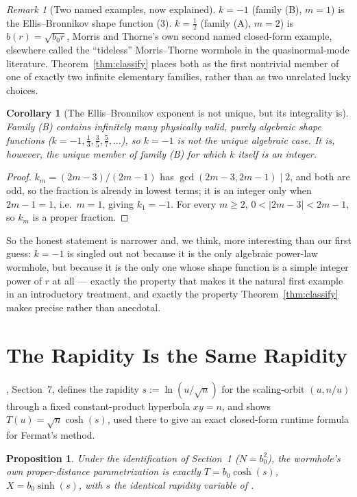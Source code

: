 \documentclass[12pt]{amsart}
\theoremstyle{plain}
\newtheorem{proposition}[theorem]{Proposition}
\newtheorem{corollary}[theorem]{Corollary}
\theoremstyle{remark}
\newtheorem*{remark}{Remark}
\begin{document}
\begin{remark}[Two named examples, now explained]
$k=-1$ (family (B), $m=1$) is the Ellis--Bronnikov shape function (3). $k=\tfrac12$ (family (A), $m=2$) is $b(r)=\sqrt{b_0r}$, Morris and Thorne's own second named closed-form example, elsewhere called the ``tideless'' Morris--Thorne wormhole in the quasinormal-mode literature. Theorem~\ref{thm:classify} places both as the first nontrivial member of one of exactly two infinite elementary families, rather than as two unrelated lucky choices.
\end{remark}

\begin{corollary}[The Ellis--Bronnikov exponent is not unique, but its integrality is]\label{cor:unique}
Family (B) contains infinitely many physically valid, purely algebraic shape functions ($k=-1,\tfrac13,\tfrac35,\tfrac57,\dots$), so $k=-1$ is not the unique algebraic case. It is, however, the unique member of family (B) for which $k$ itself is an integer.
\end{corollary}

\begin{proof}
$k_m=(2m-3)/(2m-1)$ has $\gcd(2m-3,2m-1)\mid 2$, and both are odd, so the fraction is already in lowest terms; it is an integer only when $2m-1=1$, i.e.\ $m=1$, giving $k_1=-1$. For every $m\ge2$, $0<|2m-3|<2m-1$, so $k_m$ is a proper fraction.
\end{proof}

So the honest statement is narrower and, we think, more interesting than our first guess: $k=-1$ is singled out not because it is the only algebraic power-law wormhole, but because it is the only one whose shape function is a simple integer power of $r$ at all --- exactly the property that makes it the natural first example in an introductory treatment, and exactly the property Theorem~\ref{thm:classify} makes precise rather than anecdotal.

\section{The Rapidity Is the Same Rapidity}

\cite{Ebert2026EigenCoord}, Section~7, defines the rapidity $s:=\ln(u/\sqrt n)$ for the scaling-orbit $(u,n/u)$ through a fixed constant-product hyperbola $xy=n$, and shows $T(u)=\sqrt n\cosh(s)$, used there to give an exact closed-form runtime formula for Fermat's method.

\begin{proposition}
Under the identification of Section~1 ($N=b_0^2$), the wormhole's own proper-distance parametrization is exactly $T=b_0\cosh(s)$, $X=b_0\sinh(s)$, with $s$ the identical rapidity variable of \cite{Ebert2026EigenCoord}.
\end{proposition}
\end{document}
